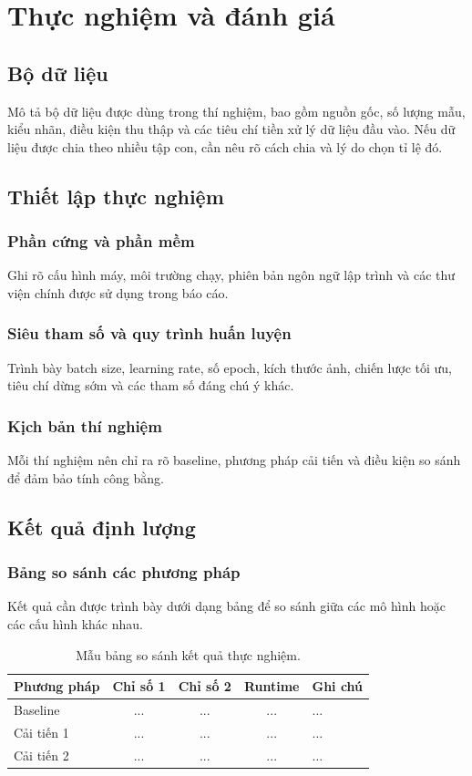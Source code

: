 \chapter{Thực nghiệm và đánh giá}

\section{Bộ dữ liệu}
Mô tả bộ dữ liệu được dùng trong thí nghiệm, bao gồm nguồn gốc, số lượng mẫu, kiểu nhãn, điều kiện thu thập và các tiêu chí tiền xử lý dữ liệu đầu vào. Nếu dữ liệu được chia theo nhiều tập con, cần nêu rõ cách chia và lý do chọn tỉ lệ đó.

\section{Thiết lập thực nghiệm}
\subsection{Phần cứng và phần mềm}
Ghi rõ cấu hình máy, môi trường chạy, phiên bản ngôn ngữ lập trình và các thư viện chính được sử dụng trong báo cáo.

\subsection{Siêu tham số và quy trình huấn luyện}
Trình bày batch size, learning rate, số epoch, kích thước ảnh, chiến lược tối ưu, tiêu chí dừng sớm và các tham số đáng chú ý khác.

\subsection{Kịch bản thí nghiệm}
Mỗi thí nghiệm nên chỉ ra rõ baseline, phương pháp cải tiến và điều kiện so sánh để đảm bảo tính công bằng.

\section{Kết quả định lượng}
\subsection{Bảng so sánh các phương pháp}
Kết quả cần được trình bày dưới dạng bảng để so sánh giữa các mô hình hoặc các cấu hình khác nhau.

\begin{table}[H]
    \centering
    \caption{Mẫu bảng so sánh kết quả thực nghiệm.}
    \label{tab:results_template}
    \begin{tabular}{|l|c|c|c|l|}
        \hline
        \textbf{Phương pháp} & \textbf{Chỉ số 1} & \textbf{Chỉ số 2} & \textbf{Runtime} & \textbf{Ghi chú} \\
        \hline
        Baseline & ... & ... & ... & ... \\
        \hline
        Cải tiến 1 & ... & ... & ... & ... \\
        \hline
        Cải tiến 2 & ... & ... & ... & ... \\
        \hline
    \end{tabular}
\end{table}

